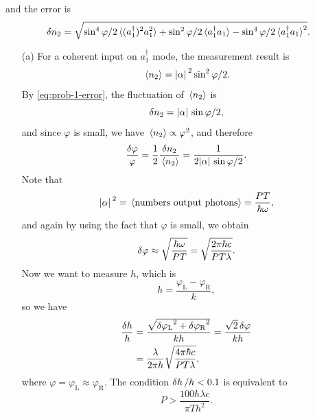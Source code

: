 \documentclass[hyperref, a4paper]{article}
\begin{document}
and the error is 
\begin{equation}
    \var{n_2} = \sqrt{\sin^4 \varphi / 2 \expval*{(a_1^\dagger)^2 a_1^2} + \sin^2 \varphi / 2 \expval*{a_1^\dagger a_1} - \sin^4 \varphi / 2 \expval*{a_1^\dagger a_1}^2}.
    \label{eq:prob-1-error}
\end{equation}
\begin{itemize}
\item[(a)] For a coherent input on $a_1^\dagger$ mode, the measurement result is 
\begin{equation}
    \expval*{n_2} = \abs*{\alpha}^2 \sin^2 \varphi / 2.
\end{equation} 
By \eqref{eq:prob-1-error}, the fluctuation of $\expval*{n_2}$ is 
\[
    \var{n_2} = \abs*{\alpha} \sin \varphi / 2 ,
\]
and since $\varphi$ is small, we have $\expval*{n_2} \propto \varphi^2$, and therefore 
\begin{equation}
    \frac{\var{\varphi}}{\varphi} = \frac{1}{2} \frac{\var{n_2}}{\expval*{n_2}} = \frac{1}{2 \abs*{\alpha} \sin \varphi / 2}.
    \label{eq:prob-2-phi-error-1}
\end{equation}
Note that 
\[
    \abs*{\alpha}^2 = \expval*{\text{numbers output photons}} = \frac{PT}{\hbar \omega}, 
\]
and again by using the fact that $\varphi$ is small, we obtain 
\begin{equation}
    \var{\varphi} \approx \sqrt{\frac{\hbar \omega}{PT}} 
    = \sqrt{\frac{2 \pi \hbar c}{PT \lambda}}. 
\end{equation}
Now we want to measure $h$, which is 
\begin{equation}
    h = \frac{\varphi_\text{L} - \varphi_\text{R}}{k}, 
\end{equation}
so we have 
\begin{equation}
    \begin{aligned}
        \frac{\var{h}}{h} &= \frac{\sqrt{\var{\varphi_\text{L}}^2 + \var{\varphi_\text{R}}^2}}{k h} = \frac{\sqrt{2} \var{\varphi} }{k h} \\
        &= \frac{\lambda}{2 \pi h} \sqrt{\frac{4 \pi \hbar c}{P T \lambda}},
    \end{aligned}
\end{equation}
where $\varphi = \varphi_\text{L} \approx \varphi_\text{R}$.
The condition $\var{h} / h < 0.1$ is equivalent to 
\begin{equation}
    P > \frac{100 \hbar \lambda c}{\pi T h^2}.
\end{equation}


\end{itemize}
\end{document}
